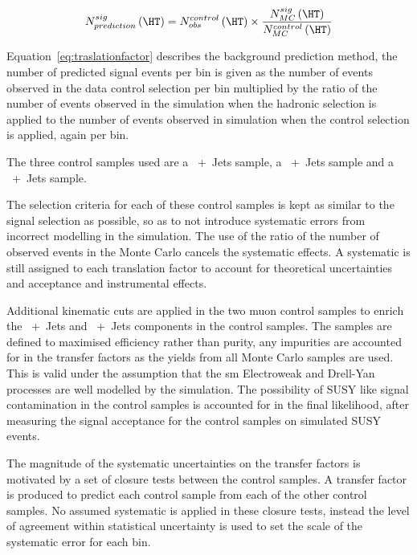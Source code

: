 \begin{equation}
  N^{sig}_{prediction}\left(\HT\right) = N_{obs}^{control}\left(\HT\right) \times \frac{N_{MC}^{sig}\left(\HT\right)}{N_{MC}^{control}\left(\HT\right)}
\label{eq:traslationfactor}
\end{equation}

Equation~\eqref{eq:traslationfactor} describes the background prediction 
method, the number of predicted signal events per \HT bin is given as the 
number of events observed in the data control selection per \HT bin multiplied 
by the ratio of the number of events observed in the simulation when the 
hadronic selection is applied to the number of events observed in simulation 
when the control selection is applied, again per \HT bin.

The three control samples used are a \HepProcess{\PW\to\Pmu\APnu}~+~Jets 
sample, a \HepProcess{\PZ\to\Pmu\Pmu}~+~Jets sample and a 
\HepProcess{\Pphoton}~+~Jets sample.

The selection criteria for each of these control samples is kept as similar to 
the signal selection as possible, so as to not introduce systematic errors from 
incorrect modelling in the simulation. The use of the ratio of the number of 
observed events in the Monte Carlo cancels the systematic effects. A systematic 
is still assigned to each translation factor to account for theoretical 
uncertainties and acceptance and instrumental effects.

Additional kinematic cuts are applied in the two muon control samples to enrich 
the \HepProcess{\PW}~+~Jets \HepProcess{\Ptop\APtop} and 
\HepProcess{\PZ}~+~Jets components in the control samples. The samples are 
defined to maximised efficiency rather than purity, any impurities are 
accounted for in the transfer factors as the yields from all Monte Carlo samples 
are used. This is valid under the assumption that the \ac{sm} 
Electroweak and Drell-Yan processes are well modelled by the simulation.
The possibility of SUSY like signal contamination in the control samples is 
accounted for in the final likelihood, after measuring the signal acceptance 
for the control samples on simulated SUSY events.

The magnitude of the systematic uncertainties on the transfer factors is 
motivated by a set of closure tests between the control samples. A transfer 
factor is produced to predict each control sample from each of the other 
control samples. No assumed systematic is applied in these closure tests, 
instead the level of agreement within statistical uncertainty is used to set 
the scale of the systematic error for each \HT bin.


